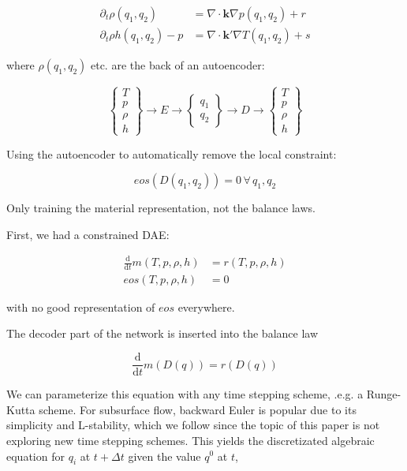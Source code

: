 \documentclass[]{article}
\begin{document}
\begin{align}
\partial_t \rho(q_1,q_2) & = \nabla \cdot \mathbf{k} \nabla p(q_1,q_2) + r \\
\partial_t \rho h(q_1,q_2)-p & = \nabla \cdot \mathbf{k'}\nabla T(q_1,q_2) + s
\end{align}

where \(\rho(q_1,q_2)\) etc. are the back of an autoencoder:

\begin{equation}
\left\{ \begin{array}{c}
T\\ p\\ \rho\\ h
\end{array}\right\} \rightarrow  E \rightarrow 
\left\{ \begin{array}{c} q_1\\q_2 \end{array} \right\}\rightarrow D \rightarrow 
\left\{ \begin{array}{c}
T\\ p\\ \rho\\ h
\end{array}\right\}
\end{equation}

Using the autoencoder to automatically remove the local constraint:

\begin{equation}
eos(D(q_1,q_2)) = 0 \, \forall \,q_1,q_2
\end{equation}

Only training the material representation, not the balance
laws.

First, we had a constrained DAE:

\begin{align}
\frac{\mathrm{d}}{\mathrm{d}t} m(T,p,\rho,h) &= r(T,p,\rho,h)\\
eos(T,p,\rho,h) &= 0
\end{align}

with no good representation of \(eos\) everywhere.

The decoder part of the network is inserted into the balance law

\begin{equation}
\frac{\mathrm{d}}{\mathrm{d}t} m(D(q)) = r(D(q))
\end{equation}

We can parameterize this equation with any time stepping scheme, .e.g. a
Runge-Kutta scheme. For subsurface flow, backward Euler is popular due
to its simplicity and L-stability, which we follow since the topic of
this paper is not exploring new time stepping schemes. This yields the
discretizated algebraic equation for \(q_i\) at \(t+\Delta t\) given the
value \(q^0\) at \(t\),
\end{document}
